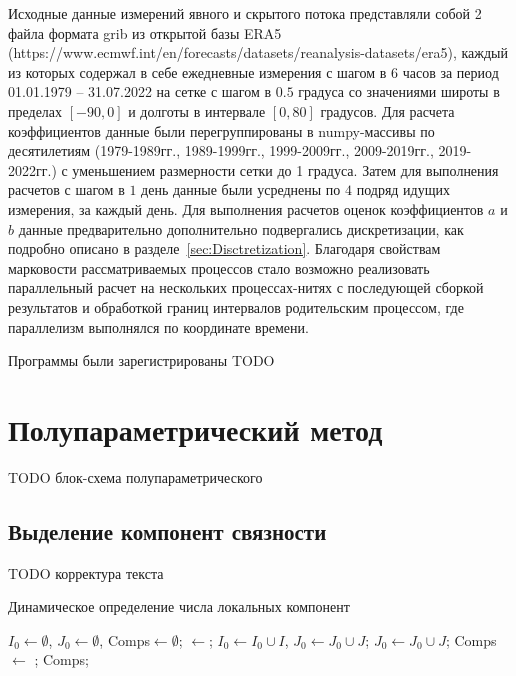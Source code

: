 Исходные данные измерений явного и скрытого потока представляли собой 2 файла формата grib из открытой базы ERA5 (https://www.ecmwf.int/en/forecasts/datasets/reanalysis-datasets/era5), каждый из которых содержал в себе ежедневные измерения с шагом в $6$ часов за период 01.01.1979 -- 31.07.2022 на сетке с шагом в $0.5$ градуса со значениями широты в пределах $[-90, 0]$ и долготы в интервале $[0, 80]$ градусов. Для расчета коэффициентов данные были перегруппированы в numpy-массивы по десятилетиям (1979-1989гг., 1989-1999гг., 1999-2009гг., 2009-2019гг., 2019-2022гг.) с уменьшением размерности сетки до 1 градуса. Затем для выполнения расчетов с шагом в $1$ день данные были усреднены по $4$ подряд идущих измерения, за каждый день. Для выполнения расчетов оценок коэффициентов $a$ и $b$ данные предварительно дополнительно подвергались дискретизации, как подробно описано в разделе~\ref{sec:Disctretization}. Благодаря свойствам марковости рассматриваемых процессов стало возможно реализовать параллельный расчет на нескольких процессах-нитях с последующей сборкой результатов и обработкой границ интервалов родительским процессом, где параллелизм выполнялся по координате времени. 

Программы были зарегистрированы TODO \cite{progbib1, progbib2}

\section{Полупараметрический метод}
\label{sec:AlgoSemiparametric}
TODO блок-схема полупараметрического

\subsection{Выделение компонент связности}
TODO корректура текста
\label{sec:ComponentsAlgo}
\begin{algorithm}[!h]
	\caption{Динамическое определение числа локальных компонент}
	\label{AlgGreedy}
	\begin{algorithmic}[1]
		\State  $I_0\gets \emptyset$, $J_0\gets \emptyset$, Comps$\gets \emptyset$;
		\Repeat {}
		\State {}
		\State [I, J]$\gets$;
		\State $I_0\gets I_0\cup I$, $J_0\gets J_0\cup J$;
		\Else{}
		\State $J_0\gets J_0\cup J$;
		\State Comps $\gets$ ;
		\EndIf
		\State \Return Comps;
		\EndFunction
	\end{algorithmic}
\end{algorithm}

